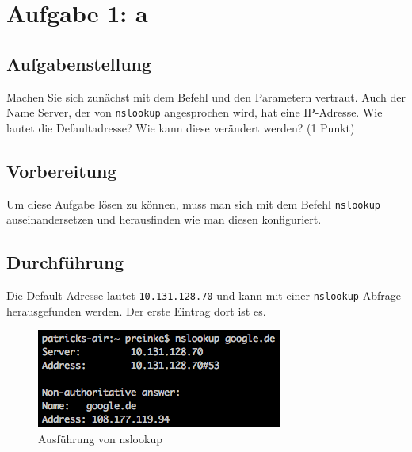 \newpage
\section{Aufgabe 1: a}

\subsection{Aufgabenstellung}
Machen Sie sich zunächst mit dem Befehl und den Parametern vertraut. Auch der Name Server, der von \texttt{nslookup} angesprochen wird, hat eine IP-Adresse. Wie lautet die Defaultadresse? Wie kann diese verändert werden? (1 Punkt)

\subsection{Vorbereitung}
Um diese Aufgabe lösen zu können, muss man sich mit dem Befehl \texttt{nslookup} auseinandersetzen und herausfinden wie man diesen konfiguriert. 

\subsection{Durchführung}
Die Default Adresse lautet \texttt{10.131.128.70} und kann mit einer \texttt{nslookup} Abfrage herausgefunden werden. Der erste Eintrag dort ist es.

\begin{figure}[H]
	\centering
	\includegraphics[width=0.4 \linewidth]{images/11}
	\caption{Ausführung von nslookup}
\end{figure}